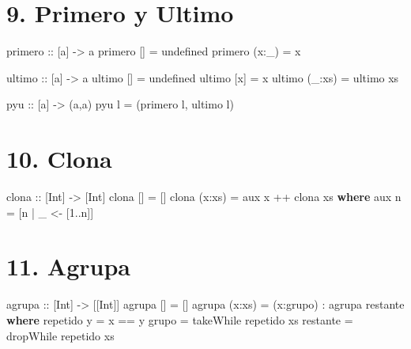 \documentclass[spanish,]{article}
\newenvironment{Shaded}{}{}
\newcommand{\DataTypeTok}[1]{\textcolor[rgb]{0.56,0.13,0.00}{#1}}
\newcommand{\DecValTok}[1]{\textcolor[rgb]{0.25,0.63,0.44}{#1}}
\newcommand{\FunctionTok}[1]{\textcolor[rgb]{0.02,0.16,0.49}{#1}}
\newcommand{\KeywordTok}[1]{\textcolor[rgb]{0.00,0.44,0.13}{\textbf{#1}}}
\newcommand{\NormalTok}[1]{#1}
\newcommand{\OtherTok}[1]{\textcolor[rgb]{0.00,0.44,0.13}{#1}}
\begin{document}
\hypertarget{primero-y-ultimo}{%
\section{9. Primero y Ultimo}\label{primero-y-ultimo}}

\begin{Shaded}
\begin{Highlighting}[]
\OtherTok{primero ::}\NormalTok{ [a] }\OtherTok{->}\NormalTok{ a}
\NormalTok{primero []     }\FunctionTok{=}\NormalTok{ undefined}
\NormalTok{primero (x}\FunctionTok{:}\NormalTok{_) }\FunctionTok{=}\NormalTok{ x}

\OtherTok{ultimo ::}\NormalTok{ [a] }\OtherTok{->}\NormalTok{ a}
\NormalTok{ultimo     [] }\FunctionTok{=}\NormalTok{ undefined}
\NormalTok{ultimo    [x] }\FunctionTok{=}\NormalTok{ x}
\NormalTok{ultimo (_}\FunctionTok{:}\NormalTok{xs) }\FunctionTok{=}\NormalTok{ ultimo xs}

\OtherTok{pyu ::}\NormalTok{ [a] }\OtherTok{->}\NormalTok{ (a,a)}
\NormalTok{pyu l }\FunctionTok{=}\NormalTok{ (primero l, ultimo l)}
\end{Highlighting}
\end{Shaded}

\hypertarget{clona}{%
\section{10. Clona}\label{clona}}

\begin{Shaded}
\begin{Highlighting}[]
\OtherTok{clona ::}\NormalTok{ [}\DataTypeTok{Int}\NormalTok{] }\OtherTok{->}\NormalTok{ [}\DataTypeTok{Int}\NormalTok{]}
\NormalTok{clona [] }\FunctionTok{=}\NormalTok{ []}
\NormalTok{clona (x}\FunctionTok{:}\NormalTok{xs) }\FunctionTok{=}\NormalTok{ aux x }\FunctionTok{++}\NormalTok{ clona xs}
  \KeywordTok{where}\NormalTok{ aux n }\FunctionTok{=}\NormalTok{ [n }\FunctionTok{|}\NormalTok{ _ }\OtherTok{<-}\NormalTok{ [}\DecValTok{1}\FunctionTok{..}\NormalTok{n]]}
\end{Highlighting}
\end{Shaded}

\hypertarget{agrupa}{%
\section{11. Agrupa}\label{agrupa}}

\begin{Shaded}
\begin{Highlighting}[]
\OtherTok{agrupa ::}\NormalTok{ [}\DataTypeTok{Int}\NormalTok{] }\OtherTok{->}\NormalTok{ [[}\DataTypeTok{Int}\NormalTok{]]}
\NormalTok{agrupa []     }\FunctionTok{=}\NormalTok{ []}
\NormalTok{agrupa (x}\FunctionTok{:}\NormalTok{xs) }\FunctionTok{=}\NormalTok{ (x}\FunctionTok{:}\NormalTok{grupo) }\FunctionTok{:}\NormalTok{ agrupa restante}
  \KeywordTok{where}
\NormalTok{    repetido y }\FunctionTok{=}\NormalTok{ x }\FunctionTok{==}\NormalTok{ y}
\NormalTok{    grupo      }\FunctionTok{=}\NormalTok{ takeWhile repetido xs}
\NormalTok{    restante   }\FunctionTok{=}\NormalTok{ dropWhile repetido xs}
\end{Highlighting}
\end{Shaded}
\end{document}
